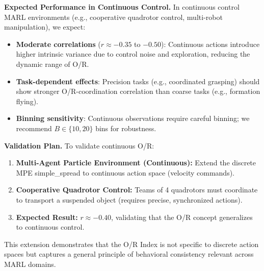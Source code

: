 \textbf{Expected Performance in Continuous Control.} In continuous control MARL environments (e.g., cooperative quadrotor control, multi-robot manipulation), we expect:
\begin{itemize}
    \item \textbf{Moderate correlations} ($r \approx -0.35$ to $-0.50$): Continuous actions introduce higher intrinsic variance due to control noise and exploration, reducing the dynamic range of O/R.
    \item \textbf{Task-dependent effects}: Precision tasks (e.g., coordinated grasping) should show stronger O/R-coordination correlation than coarse tasks (e.g., formation flying).
    \item \textbf{Binning sensitivity}: Continuous observations require careful binning; we recommend $B \in \{10, 20\}$ bins for robustness.
\end{itemize}

\textbf{Validation Plan.} To validate continuous O/R:
\begin{enumerate}
    \item \textbf{Multi-Agent Particle Environment (Continuous):} Extend the discrete MPE simple\_spread to continuous action space (velocity commands).
    \item \textbf{Cooperative Quadrotor Control:} Teams of 4 quadrotors must coordinate to transport a suspended object (requires precise, synchronized actions).
    \item \textbf{Expected Result:} $r \approx -0.40$, validating that the O/R concept generalizes to continuous control.
\end{enumerate}

This extension demonstrates that the O/R Index is not specific to discrete action spaces but captures a general principle of behavioral consistency relevant across MARL domains.

